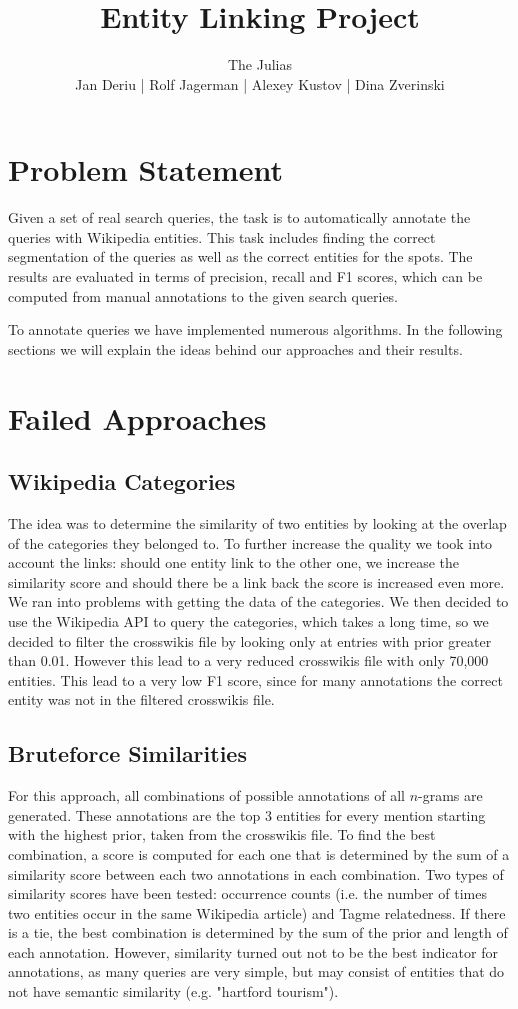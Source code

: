 \documentclass[a4paper,10pt,twocolumn]{article}
\title{Entity Linking Project}
\author{\Large{The Julias}\\Jan Deriu | Rolf Jagerman | Alexey Kustov | Dina Zverinski}
\begin{document}
\maketitle

\section{Problem Statement}
Given a set of real search queries, the task is to automatically annotate the queries with Wikipedia entities. This task includes finding the correct segmentation of the queries as well as the correct entities for the spots. The results are evaluated in terms of precision, recall and F1 scores, which can be computed from manual annotations to the given search queries.

To annotate queries we have implemented numerous algorithms. In the following sections we will explain the ideas behind our approaches and their results.

\section{Failed Approaches}
\subsection{Wikipedia Categories}
The idea was to determine the similarity of two entities by looking at the overlap of the categories they belonged to. To further increase the quality we took into account the links: should one entity link to the other one, we increase the similarity score and should there be a link back the score is increased even more.
We ran into problems with getting the data of the categories. We then decided to use the Wikipedia API to query the categories, which takes a long time, so we decided to filter the crosswikis file by looking only at entries with prior greater than 0.01. However this lead to a very reduced crosswikis file with only 70,000 entities.
This lead to a very low F1 score, since for many annotations the correct entity was not in the filtered crosswikis file.  

\subsection{Bruteforce Similarities}
For this approach, all combinations of possible annotations of all $n$-grams are generated. These annotations are the top 3 entities for every mention starting with the highest prior, taken from the crosswikis file. To find the best combination, a score is computed for each one that is determined by the sum of a similarity score between each two annotations in each combination. Two types of similarity scores have been tested: occurrence counts (i.e. the number of times two entities occur in the same Wikipedia article) and Tagme relatedness. If there is a tie, the best combination is determined by the sum of the prior and length of each annotation.
However, similarity turned out not to be the best indicator for annotations, as many queries are very simple, but may consist of entities that do not have semantic similarity (e.g. "hartford tourism").
\end{document}
